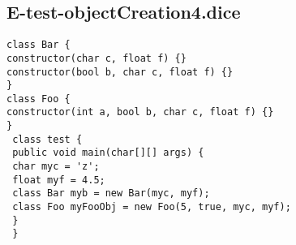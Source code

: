 \subsection{E-test-objectCreation4.dice}
\begin{verbatim}
class Bar {
constructor(char c, float f) {}
constructor(bool b, char c, float f) {}
}
class Foo {
constructor(int a, bool b, char c, float f) {}
}
 class test {
 public void main(char[][] args) {
 char myc = 'z';
 float myf = 4.5;
 class Bar myb = new Bar(myc, myf);
 class Foo myFooObj = new Foo(5, true, myc, myf);
 }
 }
\end{verbatim}
